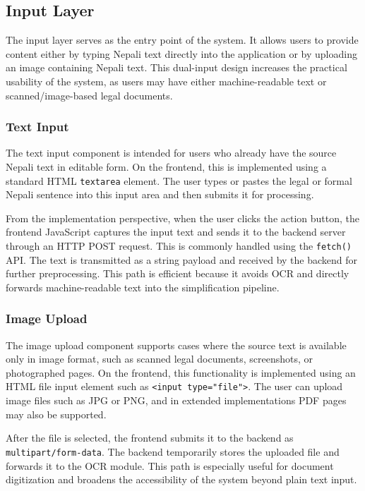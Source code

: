 \documentclass[12pt]{report}
\begin{document}
\subsection{Input Layer}

The input layer serves as the entry point of the system. It allows users to provide content either by typing Nepali text directly into the application or by uploading an image containing Nepali text. This dual-input design increases the practical usability of the system, as users may have either machine-readable text or scanned/image-based legal documents.

\subsubsection{Text Input}

The text input component is intended for users who already have the source Nepali text in editable form. On the frontend, this is implemented using a standard HTML \texttt{textarea} element. The user types or pastes the legal or formal Nepali sentence into this input area and then submits it for processing.

From the implementation perspective, when the user clicks the action button, the frontend JavaScript captures the input text and sends it to the backend server through an HTTP POST request. This is commonly handled using the \texttt{fetch()} API. The text is transmitted as a string payload and received by the backend for further preprocessing. This path is efficient because it avoids OCR and directly forwards machine-readable text into the simplification pipeline.

\subsubsection{Image Upload}

The image upload component supports cases where the source text is available only in image format, such as scanned legal documents, screenshots, or photographed pages. On the frontend, this functionality is implemented using an HTML file input element such as \texttt{<input type="file">}. The user can upload image files such as JPG or PNG, and in extended implementations PDF pages may also be supported.

After the file is selected, the frontend submits it to the backend as \texttt{multipart/form-data}. The backend temporarily stores the uploaded file and forwards it to the OCR module. This path is especially useful for document digitization and broadens the accessibility of the system beyond plain text input.
\end{document}

